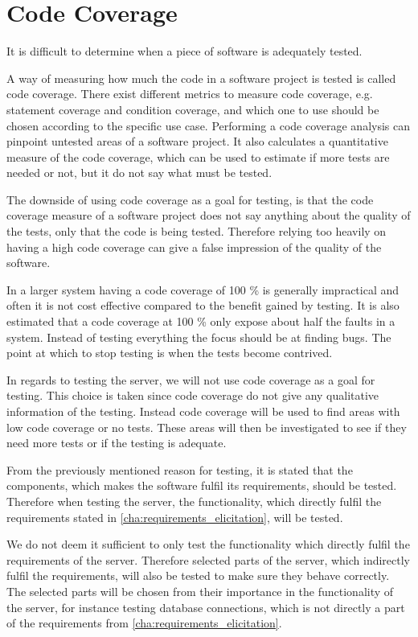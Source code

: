 \section{Code Coverage}\label{sec:code_coverage}
It is difficult to determine when a piece of software is adequately tested.

A way of measuring how much the code in a software project is tested is called code coverage.
There exist different metrics to measure code coverage, e.g. statement coverage and condition coverage,
and which one to use should be chosen according to the specific use case.
Performing a code coverage analysis can pinpoint untested areas of a software project.
It also calculates a quantitative measure of the code coverage,
which can be used to estimate if more tests are needed or not,
but it do not say what must be tested.\cite{code_coverage}

The downside of using code coverage as a goal for testing,
is that the code coverage measure of a software project does not say anything about the quality of the tests,
only that the code is being tested.
Therefore relying too heavily on having a high code coverage can give a false impression of the quality of the software.\cite{code_coverage_neg}

In a larger system having a code coverage of 100 \% is generally impractical and often it is not cost effective compared to the benefit gained by testing.
It is also estimated that a code coverage at 100 \% only expose about half the faults in a system.
Instead of testing everything the focus should be at finding bugs.
The point at which to stop testing is when the tests become contrived.\cite{code_coverage_not_100}

\bigskip

In regards to testing the server, we will not use code coverage as a goal for testing.
This choice is taken since code coverage do not give any qualitative information of the testing.
Instead code coverage will be used to find areas with low code coverage or no tests.
These areas will then be investigated to see if they need more tests or if the testing is adequate.

From the previously mentioned reason for testing,
it is stated that the components, which makes the software fulfil its requirements, should be tested.
Therefore when testing the server, the functionality,
which directly fulfil the requirements stated in \cref{cha:requirements_elicitation}, will be tested.

We do not deem it sufficient to only test the functionality which directly fulfil the requirements of the server.
Therefore selected parts of the server, which indirectly fulfil the requirements,
will also be tested to make sure they behave correctly.
The selected parts will be chosen from their importance in the functionality of the server,
for instance testing database connections,
which is not directly a part of the requirements from \cref{cha:requirements_elicitation}.

